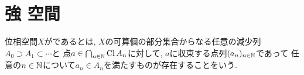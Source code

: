 \documentclass[uplatex, dvipdfmx, a4paper, 12pt, class=jsbook, crop=false]{standalone}
\begin{document}
\section{強 \Frechet 空間}
\label{sec:strongly-Frechet-spaces}

\begin{definition}
	位相空間$ X $がであるとは,
	$ X $の可算個の部分集合からなる任意の減少列$ A_0 \supset A_1 \subset \cdots $と
	点$ a \in \bigcap_{n \in \mathbb{N}} \mathop{\mathrm{Cl}}\nolimits A_n $に対して,
	$ a $に収束する点列$ (a_n)_{n \in \mathbb{N}} $であって
	任意の$ n \in \mathbb{N} $について$ a_n \in A_n $を満たすものが存在することをいう.
\end{definition}
\end{document}
